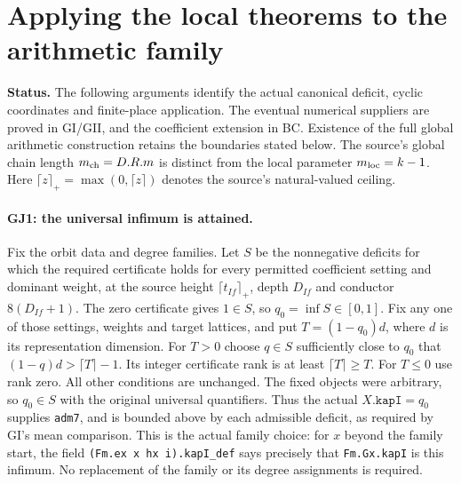 \section{Applying the local theorems to the arithmetic family}
\label{sec:family-join}

\noindent\textbf{Status.}
The following arguments identify the actual canonical deficit, cyclic
coordinates and finite-place application. The eventual numerical suppliers
are proved in GI/GII, and the coefficient extension in BC. Existence of
the full global arithmetic construction retains the boundaries stated
below. The source's global chain length $m_{\rm ch}=D.R.m$ is distinct
from the local parameter $m_{\rm loc}=k-1$.
Here $\lceil z\rceil_+=\max(0,\lceil z\rceil)$ denotes the source's
natural-valued ceiling.

\paragraph{GJ1: the universal infimum is attained.}
Fix the orbit data and degree families. Let $S$ be the nonnegative
deficits for which the required certificate holds for every permitted
coefficient setting and dominant weight, at the source height
$\lceil t_{If}\rceil_+$, depth $D_{If}$ and conductor $8(D_{If}+1)$.
The zero certificate gives $1\in S$, so $q_0=\inf S\in[0,1]$.
Fix any one of those settings, weights and target lattices, and put
$T=(1-q_0)d$, where $d$ is its representation dimension.
For $T>0$ choose $q\in S$ sufficiently close to $q_0$ that
$(1-q)d>\lceil T\rceil-1$. Its integer certificate rank is at least
$\lceil T\rceil\ge T$. For $T\le0$ use rank zero. All other conditions
are unchanged. The fixed objects were arbitrary, so $q_0\in S$
with the original universal quantifiers. Thus the actual
$X.\texttt{kapI}=q_0$ supplies \texttt{adm7}, and is bounded above by
each admissible deficit, as required by GI's mean comparison.
This is the actual family choice: for $x$ beyond the family start,
the field \texttt{(Fm.ex x hx i).kapI\_def} says precisely that
\texttt{Fm.Gx.kapI} is this infimum. No replacement of the family
or its degree assignments is required.

